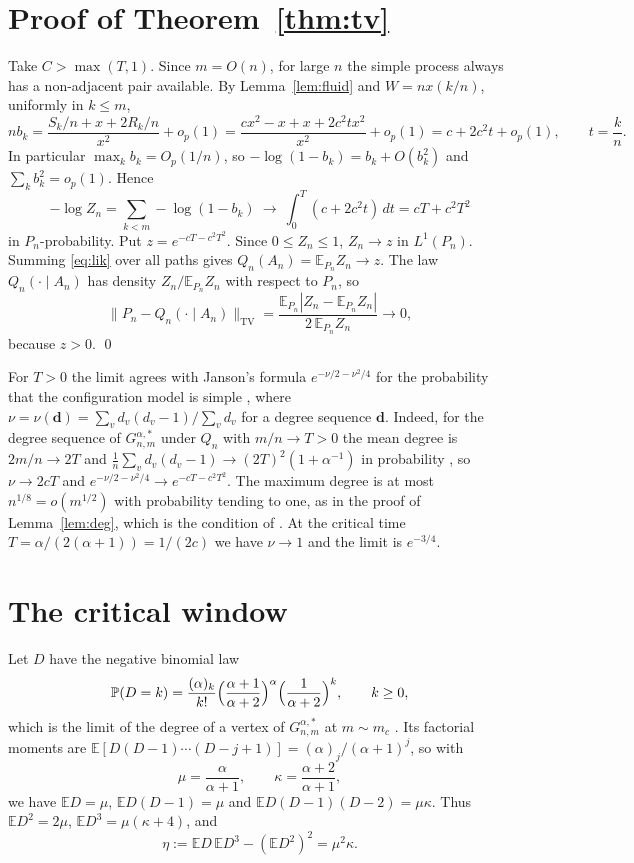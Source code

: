 \documentclass[11pt]{amsart}
\theoremstyle{remark}
\numberwithin{equation}{section}
\newcommand{\PP}{\mathbb{P}}
\newcommand{\EE}{\mathbb{E}}
\newcommand{\TV}{\mathrm{TV}}
\begin{document}
\section{Proof of Theorem~\ref{thm:tv}}\label{sec:prooftv}

Take $C>\max(T,1)$. Since $m=O(n)$, for large $n$ the simple process always has a non-adjacent pair available. By Lemma~\ref{lem:fluid} and $W=nx(k/n)$, uniformly in $k\le m$,
\[
nb_k=\frac{S_k/n+x+2R_k/n}{x^2}+o_p(1)=\frac{cx^2-x+x+2c^2tx^2}{x^2}+o_p(1)=c+2c^2t+o_p(1),\qquad t=\frac kn .
\]
In particular $\max_kb_k=O_p(1/n)$, so $-\log(1-b_k)=b_k+O(b_k^2)$ and $\sum_kb_k^2=o_p(1)$. Hence
\[
-\log Z_n=\sum_{k<m}-\log(1-b_k)\ \to\ \int_0^T(c+2c^2t)\,dt=cT+c^2T^2
\]
in $P_n$-probability. Put $z=e^{-cT-c^2T^2}$. Since $0\le Z_n\le1$, $Z_n\to z$ in $L^1(P_n)$. Summing \eqref{eq:lik} over all paths gives $Q_n(A_n)=\EE_{P_n}Z_n\to z$. The law $Q_n(\cdot\mid A_n)$ has density $Z_n/\EE_{P_n}Z_n$ with respect to $P_n$, so
\[
\bigl\|P_n-Q_n(\cdot\mid A_n)\bigr\|_{\TV}=\frac{\EE_{P_n}|Z_n-\EE_{P_n}Z_n|}{2\,\EE_{P_n}Z_n}\to0,
\]
because $z>0$. \qed

For $T>0$ the limit agrees with Janson's formula $e^{-\nu/2-\nu^2/4}$ for the probability that the configuration model is simple \cite[Corollary~1.5]{Ja09}, where $\nu=\nu(\boldsymbol d)=\sum_v d_v(d_v-1)/\sum_v d_v$ for a degree sequence $\boldsymbol d$. Indeed, for the degree sequence of $G^{\alpha,*}_{n,m}$ under $Q_n$ with $m/n\to T>0$ the mean degree is $2m/n\to2T$ and $\frac1n\sum_vd_v(d_v-1)\to(2T)^2(1+\alpha^{-1})$ in probability \cite[Theorem~2.5 and Remark~2.7]{JW21}, so $\nu\to2cT$ and $e^{-\nu/2-\nu^2/4}\to e^{-cT-c^2T^2}$. The maximum degree is at most $n^{1/8}=o(m^{1/2})$ with probability tending to one, as in the proof of Lemma~\ref{lem:deg}, which is the condition of \cite[Corollary~1.5]{Ja09}. At the critical time $T=\alpha/(2(\alpha+1))=1/(2c)$ we have $\nu\to1$ and the limit is $e^{-3/4}$.

\section{The critical window}\label{sec:window}

Let $D$ have the negative binomial law
\[
\PP(D=k)=\frac{(\alpha)_k}{k!}\Bigl(\frac{\alpha+1}{\alpha+2}\Bigr)^{\alpha}\Bigl(\frac{1}{\alpha+2}\Bigr)^{k},\qquad k\ge0,
\]
which is the limit of the degree of a vertex of $G^{\alpha,*}_{n,m}$ at $m\sim m_c$ \cite[Theorem~2.5]{JW21}. Its factorial moments are $\EE[D(D-1)\cdots(D-j+1)]=(\alpha)_j/(\alpha+1)^j$, so with
\[
\mu=\frac{\alpha}{\alpha+1},\qquad \kappa=\frac{\alpha+2}{\alpha+1},
\]
we have $\EE D=\mu$, $\EE D(D-1)=\mu$ and $\EE D(D-1)(D-2)=\mu\kappa$. Thus $\EE D^2=2\mu$, $\EE D^3=\mu(\kappa+4)$, and
\[
\eta:=\EE D\,\EE D^3-(\EE D^2)^2=\mu^2\kappa .
\]
\end{document}
